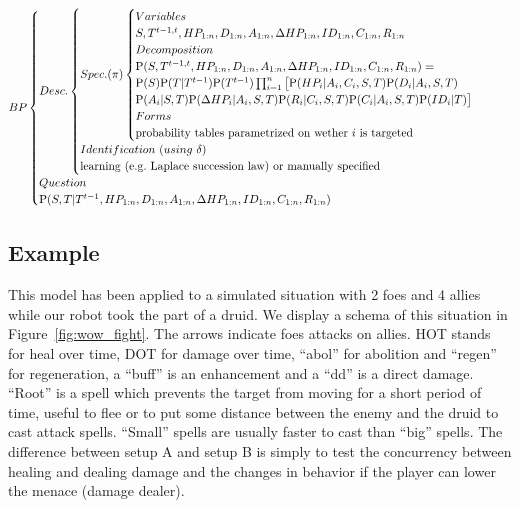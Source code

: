 \begin{eqnarray*}
BP
\begin{cases}
Desc.
    \begin{cases}
    Spec. (\pi)
        \begin{cases}
        Variables\\
        S, T^{t-1,t}, HP_{1:n}, D_{1:n}, A_{1:n}, \Delta HP_{1:n}, ID_{1:n}, C_{1:n}, R_{1:n}\\
        Decomposition\\
        \PP(S, T^{t-1,t}, HP_{1:n}, D_{1:n}, A_{1:n}, \Delta HP_{1:n}, ID_{1:n}, C_{1:n}, R_{1:n}) = \\
        \PP(S)\PP(T|T^{t-1})\PP(T^{t-1})\prod_{i=1}^n \big[ \PP(HP_i | A_i, C_i, S, T)\PP(D_i | A_i, S, T) \\
                \PP(A_i | S, T)\PP(\Delta HP_i | A_i, S, T) \PP(R_i | C_i, S, T) \PP(C_i | A_i, S, T) \PP(ID_i | T)\big]\\
        Forms\\
        \mathrm{probability\ tables\ parametrized\ on\ wether\ }i\ \mathrm{is\ targeted}\\
        \end{cases}\\
    Identification\ (using\ \delta)\\
    \mathrm{learning\ (e.g.\ Laplace\ succession\ law)\ or\ manually\ specified}\\
    \end{cases}\\
Question\\
\PP(S,T|T^{t-1}, HP_{1:n}, D_{1:n}, A_{1:n}, \Delta HP_{1:n}, ID_{1:n}, C_{1:n}, R_{1:n})
\end{cases}
\end{eqnarray*}

\subsection{Example}

This model has been applied to a simulated situation with 2 foes and 4 allies while our robot took the part of a druid. %
We display a schema of this situation in Figure~\ref{fig:wow_fight}. The arrows indicate foes attacks on allies. %
HOT stands for heal over time, DOT for damage over time, ``abol'' for abolition and ``regen'' for regeneration, a ``buff'' is an enhancement and a ``dd'' is a direct damage. ``Root'' is a spell which prevents the target from moving for a short period of time, useful to flee or to put some distance between the enemy and the druid to cast attack spells. ``Small'' spells are usually faster to cast than ``big'' spells. The difference between setup A and setup B is simply to test the concurrency between healing and dealing damage and the changes in behavior if the player can lower the menace (damage dealer).

